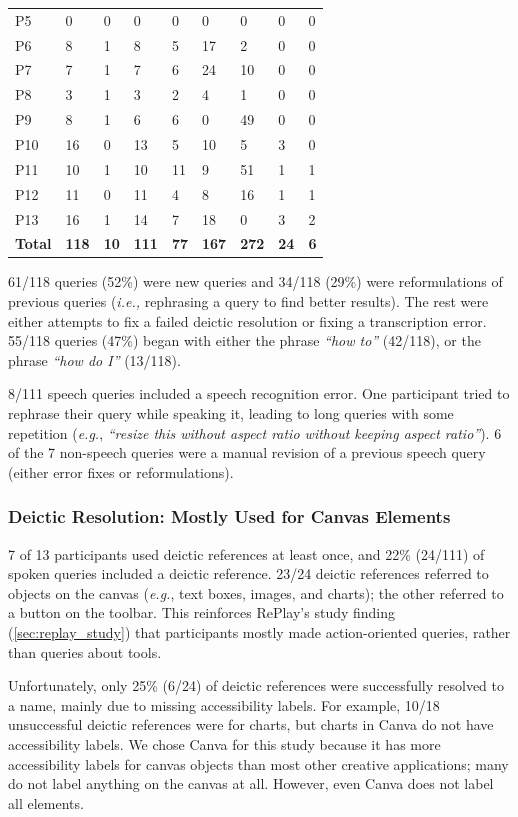 \begin{table}[t!]
{\begin{tabular}{lllllllll}
P5 & 0 & 0 & 0 & 0 & 0 & 0 & 0 & 0 \\
P6 & 8 & 1 & 8 & 5 & 17 & 2 & 0 & 0 \\
P7 & 7 & 1 & 7 & 6 & 24 & 10 & 0 & 0 \\
P8 & 3 & 1 & 3 & 2 & 4 & 1 & 0 & 0 \\
P9 & 8 & 1 & 6 & 6 & 0 & 49 & 0 & 0 \\
P10 & 16 & 0 & 13 & 5 & 10 & 5 & 3 & 0 \\
P11 & 10 & 1 & 10 & 11 & 9 & 51 & 1 & 1 \\
P12 & 11 & 0 & 11 & 4 & 8 & 16 & 1 & 1 \\
P13 & 16 & 1 & 14 & 7 & 18 & 0 & 3 & 2 \\
\textbf{Total} & \textbf{118} & \textbf{10} & \textbf{111} & \textbf{77} & \textbf{167} & \textbf{272} & \textbf{24} & \textbf{6}
\end{tabular}
}
\end{table}

61/118 queries (52\%) were new queries and 34/118 (29\%) were reformulations of previous queries (\textit{i.e.,} rephrasing a query to find better results). The rest were either attempts to fix a failed deictic resolution or fixing a transcription error. 55/118 queries (47\%) began with either the phrase \textit{``how to''} (42/118), or the phrase \textit{``how do I''} (13/118). 

8/111 speech queries included a speech recognition error. One participant tried to rephrase their query while speaking it, leading to long queries with some repetition (\textit{e.g.}, \textit{``resize this without aspect ratio without keeping aspect ratio''}). 6 of the 7 non-speech queries were a manual revision of a previous speech query (either error fixes or reformulations). 

\subsubsection{Deictic Resolution: Mostly Used for Canvas Elements}
7 of 13 participants used deictic references at least once, and 22\% (24/111) of spoken queries included a deictic reference. 23/24 deictic references referred to objects on the canvas (\textit{e.g.}, text boxes, images, and charts); the other referred to a button on the toolbar. This reinforces RePlay's study finding (\autoref{sec:replay_study}) that participants mostly made action-oriented queries, rather than queries about tools.

Unfortunately, only 25\% (6/24) of deictic references were successfully resolved to a name, mainly due to missing accessibility labels. For example, 10/18 unsuccessful deictic references were for charts, but charts in Canva do not have accessibility labels. We chose Canva for this study because it has more accessibility labels for canvas objects than most other creative applications; many do not label anything on the canvas at all. However, even Canva does not label all elements.

